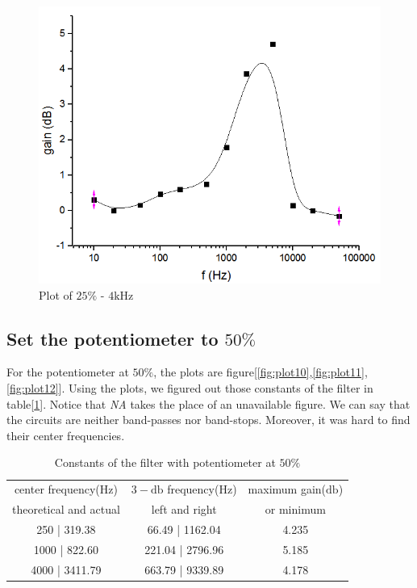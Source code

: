 \begin{figure}
	\centering
	\begin{framed}
		\includegraphics[width=\linewidth]{images/02.PNG}
		\caption{Plot of $25\%$ - $4\si{\kilo\hertz}$}
		\label{fig:plot02}
	\end{framed}
\end{figure}

\subsection{Set the potentiometer to $50\%$}
For the potentiometer at $50\%$, the plots are figure[\ref{fig:plot10},\ref{fig:plot11},\ref{fig:plot12}]. Using the plots, we figured out those constants of the filter in table[\ref{tab:cnst1}]. Notice that \textit{NA} takes the place of an unavailable figure. We can say that the circuits are neither band-passes nor band-stops. Moreover, it was hard to find their center frequencies.

\begin{table}[!htbp]
	\centering
	\caption{Constants of the filter with potentiometer at $50\%$}
	\label{tab:cnst1}
	\begin{tabular}{ccc}
		\toprule
		center frequency($\si{\hertz}$) & $3-\si{\decibel}$ frequency($\si{\hertz}$) & maximum gain($\si{\decibel}$) \\
		theoretical and actual & left and right & or minimum\\
		\midrule
		250 | 319.38 & 66.49 | 1162.04 & 4.235\\
		1000 | 822.60 & 221.04 | 2796.96 & 5.185\\
		4000 | 3411.79 & 663.79 | 9339.89 & 4.178\\
		\bottomrule
	\end{tabular}
\end{table}

